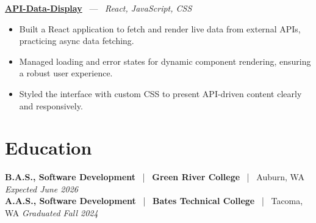 \documentclass[10pt, letterpaper]{article}
\newcommand{\jobhead}[4]{%
  \vspace{5pt}%
  {\bfseries\color{dark}#1}%
  ~{\color{light}|}~%
  {\bfseries\color{navy}#2}%
  ~{\color{light}|}~%
  {\color{light}#3}%
  \hfill{\color{light}\small\textit{#4}}\\[-2pt]%
}
\newcommand{\projhead}[3]{%
  \vspace{5pt}%
  {\bfseries\color{dark}\href{#2}{#1}}%
  ~{\color{light}---}~%
  {\color{light}\small\textit{#3}}\\[-2pt]%
}
\begin{document}
\projhead{API-Data-Display}{https://github.com/timmyd4/API-Data-Display}{React, JavaScript, CSS}
\begin{itemize}
  \item Built a React application to fetch and render live data from external APIs, practicing async data fetching.
  \item Managed loading and error states for dynamic component rendering, ensuring a robust user experience.
  \item Styled the interface with custom CSS to present API-driven content clearly and responsively.
\end{itemize}

\section{Education}

\jobhead{B.A.S., Software Development}{Green River College}{Auburn, WA}{Expected June 2026}
\jobhead{A.A.S., Software Development}{Bates Technical College}{Tacoma, WA}{Graduated Fall 2024}
\end{document}
